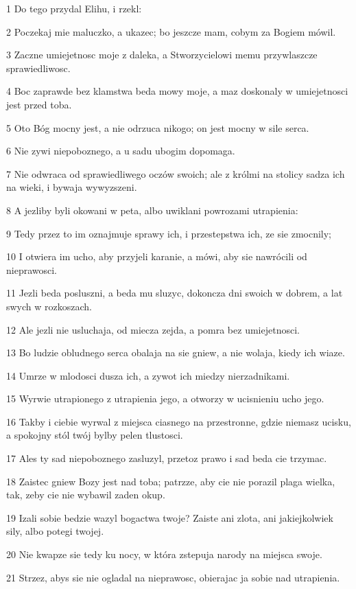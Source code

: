 \par 1 Do tego przydal Elihu, i rzekl:
\par 2 Poczekaj mie maluczko, a ukazec; bo jeszcze mam, cobym za Bogiem mówil.
\par 3 Zaczne umiejetnosc moje z daleka, a Stworzycielowi memu przywlaszcze sprawiedliwosc.
\par 4 Boc zaprawde bez klamstwa beda mowy moje, a maz doskonaly w umiejetnosci jest przed toba.
\par 5 Oto Bóg mocny jest, a nie odrzuca nikogo; on jest mocny w sile serca.
\par 6 Nie zywi niepoboznego, a u sadu ubogim dopomaga.
\par 7 Nie odwraca od sprawiedliwego oczów swoich; ale z królmi na stolicy sadza ich na wieki, i bywaja wywyzszeni.
\par 8 A jezliby byli okowani w peta, albo uwiklani powrozami utrapienia:
\par 9 Tedy przez to im oznajmuje sprawy ich, i przestepstwa ich, ze sie zmocnily;
\par 10 I otwiera im ucho, aby przyjeli karanie, a mówi, aby sie nawrócili od nieprawosci.
\par 11 Jezli beda posluszni, a beda mu sluzyc, dokoncza dni swoich w dobrem, a lat swych w rozkoszach.
\par 12 Ale jezli nie usluchaja, od miecza zejda, a pomra bez umiejetnosci.
\par 13 Bo ludzie obludnego serca obalaja na sie gniew, a nie wolaja, kiedy ich wiaze.
\par 14 Umrze w mlodosci dusza ich, a zywot ich miedzy nierzadnikami.
\par 15 Wyrwie utrapionego z utrapienia jego, a otworzy w ucisnieniu ucho jego.
\par 16 Takby i ciebie wyrwal z miejsca ciasnego na przestronne, gdzie niemasz ucisku, a spokojny stól twój bylby pelen tlustosci.
\par 17 Ales ty sad niepoboznego zasluzyl, przetoz prawo i sad beda cie trzymac.
\par 18 Zaistec gniew Bozy jest nad toba; patrzze, aby cie nie porazil plaga wielka, tak, zeby cie nie wybawil zaden okup.
\par 19 Izali sobie bedzie wazyl bogactwa twoje? Zaiste ani zlota, ani jakiejkolwiek sily, albo potegi twojej.
\par 20 Nie kwapze sie tedy ku nocy, w która zstepuja narody na miejsca swoje.
\par 21 Strzez, abys sie nie ogladal na nieprawosc, obierajac ja sobie nad utrapienia.
